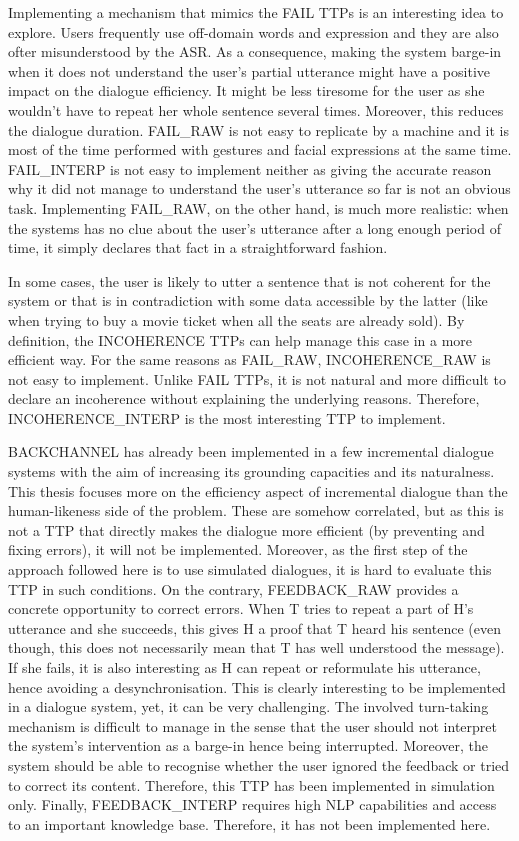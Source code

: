 				Implementing a mechanism that mimics the FAIL TTPs is an interesting idea to explore. Users frequently use off-domain words and expression \cite{Ghigi2014} and they are also ofter misunderstood by the ASR. As a consequence, making the system barge-in when it does not understand the user's partial utterance might have a positive impact on the dialogue efficiency. It might be less tiresome for the user as she wouldn't have to repeat her whole sentence several times. Moreover, this reduces the dialogue duration. FAIL\_RAW is not easy to replicate by a machine and it is most of the time performed with gestures and facial expressions at the same time. FAIL\_INTERP is not easy to implement neither as giving the accurate reason why it did not manage to understand the user's utterance so far is not an obvious task. Implementing FAIL\_RAW, on the other hand, is much more realistic: when the systems has no clue about the user's utterance after a long enough period of time, it simply declares that fact in a straightforward fashion.

				In some cases, the user is likely to utter a sentence that is not coherent for the system or that is in contradiction with some data accessible by the latter (like when trying to buy a movie ticket when all the seats are already sold). By definition, the INCOHERENCE TTPs can help manage this case in a more efficient way. For the same reasons as FAIL\_RAW, INCOHERENCE\_RAW is not easy to implement. Unlike FAIL TTPs, it is not natural and more difficult to declare an incoherence without explaining the underlying reasons. Therefore, INCOHERENCE\_INTERP is the most interesting TTP to implement.

				BACKCHANNEL has already been implemented in a few incremental dialogue systems \cite{Meena2013,Hastie2013} with the aim of increasing its grounding capacities and its naturalness. This thesis focuses more on the efficiency aspect of incremental dialogue than the human-likeness side of the problem. These are somehow correlated, but as this is not a TTP that directly makes the dialogue more efficient (by preventing and fixing errors), it will not be implemented. Moreover, as the first step of the approach followed here is to use simulated dialogues, it is hard to evaluate this TTP in such conditions. On the contrary, FEEDBACK\_RAW provides a concrete opportunity to correct errors. When T tries to repeat a part of H's utterance and she succeeds, this gives H a proof that T heard his sentence (even though, this does not necessarily mean that T has well understood the message). If she fails, it is also interesting as H can repeat or reformulate his utterance, hence avoiding a desynchronisation. This is clearly interesting to be implemented in a dialogue system, yet, it can be very challenging. The involved turn-taking mechanism is difficult to manage in the sense that the user should not interpret the system's intervention as a barge-in hence being interrupted. Moreover, the system should be able to recognise whether the user ignored the feedback or tried to correct its content. Therefore, this TTP has been implemented in simulation only. Finally, FEEDBACK\_INTERP requires high NLP capabilities and access to an important knowledge base. Therefore, it has not been implemented here.

